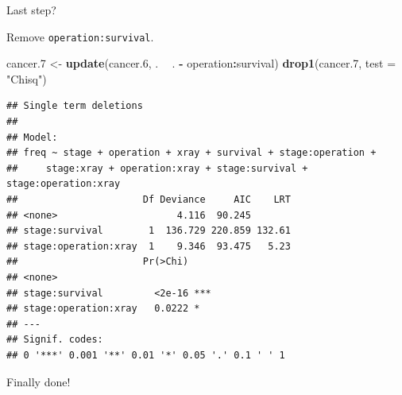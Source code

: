 \documentclass[ignorenonframetext,]{beamer}
\newenvironment{Shaded}{\begin{snugshade}}{\end{snugshade}}
\newcommand{\DataTypeTok}[1]{\textcolor[rgb]{0.13,0.29,0.53}{#1}}
\newcommand{\FloatTok}[1]{\textcolor[rgb]{0.00,0.00,0.81}{#1}}
\newcommand{\KeywordTok}[1]{\textcolor[rgb]{0.13,0.29,0.53}{\textbf{#1}}}
\newcommand{\NormalTok}[1]{#1}
\newcommand{\OperatorTok}[1]{\textcolor[rgb]{0.81,0.36,0.00}{\textbf{#1}}}
\newcommand{\StringTok}[1]{\textcolor[rgb]{0.31,0.60,0.02}{#1}}
\begin{document}
\begin{frame}[fragile]{Last step?}
\protect\hypertarget{last-step}{}

Remove \texttt{operation:survival}.

\begin{Shaded}
\begin{Highlighting}[]
\NormalTok{cancer}\FloatTok{.7}\NormalTok{ <-}\StringTok{ }\KeywordTok{update}\NormalTok{(cancer}\FloatTok{.6}\NormalTok{, . }\OperatorTok{~}\StringTok{ }\NormalTok{. }\OperatorTok{-}\StringTok{ }\NormalTok{operation}\OperatorTok{:}\NormalTok{survival)}
\KeywordTok{drop1}\NormalTok{(cancer}\FloatTok{.7}\NormalTok{, }\DataTypeTok{test =} \StringTok{"Chisq"}\NormalTok{)}
\end{Highlighting}
\end{Shaded}

\begin{verbatim}
## Single term deletions
## 
## Model:
## freq ~ stage + operation + xray + survival + stage:operation + 
##     stage:xray + operation:xray + stage:survival + stage:operation:xray
##                      Df Deviance     AIC    LRT
## <none>                     4.116  90.245       
## stage:survival        1  136.729 220.859 132.61
## stage:operation:xray  1    9.346  93.475   5.23
##                      Pr(>Chi)    
## <none>                           
## stage:survival         <2e-16 ***
## stage:operation:xray   0.0222 *  
## ---
## Signif. codes:  
## 0 '***' 0.001 '**' 0.01 '*' 0.05 '.' 0.1 ' ' 1
\end{verbatim}

Finally done!

\end{frame}
\end{document}
